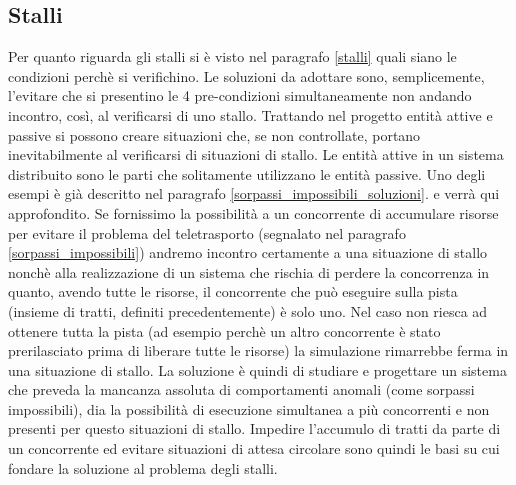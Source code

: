 \subsection{Stalli }
Per quanto riguarda gli stalli si \`{e} visto nel paragrafo \ref{stalli} quali
siano le condizioni perch\`{e} si verifichino. Le soluzioni da adottare sono,
semplicemente, l'evitare che si presentino le 4 pre-condizioni simultaneamente
non andando incontro, cos\`{i}, al verificarsi di uno stallo.
Trattando nel progetto entit\`{a} attive e passive si possono creare situazioni
che, se non controllate, portano inevitabilmente al verificarsi di situazioni di stallo. 
Le entità attive in un sistema distribuito sono le parti che solitamente utilizzano le 
entità passive. Uno degli esempi \`{e} gi\`{a} descritto nel paragrafo
\ref{sorpassi_impossibili_soluzioni}. e verr\`{a} qui approfondito. Se
fornissimo la possibilit\`{a} a un concorrente  di accumulare risorse per
evitare il problema del teletrasporto (segnalato nel paragrafo
\ref{sorpassi_impossibili}) andremo incontro certamente a una situazione di
stallo nonch\`{e} alla realizzazione di un sistema che rischia di perdere la
concorrenza in quanto, avendo tutte le risorse, il concorrente che pu\`{o}
eseguire sulla pista (insieme di tratti, definiti precedentemente) \`{e} solo
uno. Nel caso non riesca ad ottenere tutta la pista (ad esempio perch\`{e} un
altro concorrente \`{e} stato prerilasciato prima di liberare tutte le risorse)
la simulazione rimarrebbe ferma in una situazione di stallo. La soluzione \`{e}
quindi di studiare e progettare un sistema che preveda la mancanza assoluta di
comportamenti anomali (come sorpassi impossibili), dia la possibilit\`{a} di
esecuzione simultanea a pi\`{u} concorrenti e non presenti per questo situazioni
di stallo. Impedire l'accumulo di tratti da parte di un concorrente ed evitare 
situazioni di attesa circolare sono quindi le basi su cui fondare la soluzione
al problema degli stalli.
